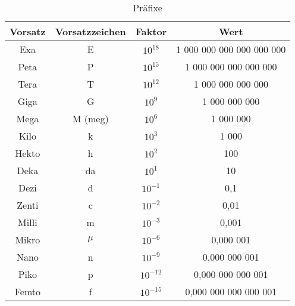 \setlength{\tabcolsep}{4pt} %
\renewcommand{\arraystretch}{1.25} %
\begin{table}[!htb]
    \centering
    \begin{tabular}{|c|c|c|c|}
        \hline
        \textbf{Vorsatz} & \textbf{Vorsatzzeichen}        & \textbf{Faktor} & \textbf{Wert} \\ \hline
        Exa                & E                    & $10^{18}$           & 1 000 000 000 000 000 000  \\
        Peta               & P                    & $10^{15}$           & 1 000 000 000 000 000      \\
        Tera               & T                    & $10^{12}$           & 1 000 000 000 000          \\
        Giga               & G                    & $10^{9}$            & 1 000 000 000              \\
        Mega               & M (meg)              & $10^{6}$            & 1 000 000                  \\
        Kilo               & k                    & $10^{3}$            & 1 000                      \\
        Hekto              & h                    & $10^{2}$            & 100                        \\
        Deka               & da                   & $10^{1}$            & 10                         \\
        Dezi               & d                    & $10^{-1}$           & 0,1                        \\ 
        Zenti              & c                    & $10^{-2}$           & 0,01                       \\
        Milli              & m                    & $10^{-3}$           & 0,001                      \\
        Mikro              & $\mu$                & $10^{-6}$           & 0,000 001                  \\ 
        Nano               & n                    & $10^{-9}$           & 0,000 000 001              \\
        Piko               & p                    & $10^{-12}$          & 0,000 000 000 001          \\
        Femto              & f                    & $10^{-15}$          & 0,000 000 000 000 001      \\
        \hline

        \hline
    \end{tabular}
    \caption{Präfixe}
\end{table}